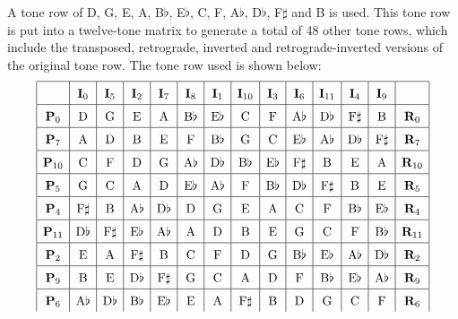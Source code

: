 \documentclass{article}
\begin{document}
A tone row of D, G, E, A, B\(\flat\), E\(\flat\), C, F, A\(\flat\), D\(\flat\), F\(\sharp\) and B is used. This tone row is put into a twelve-tone matrix to generate a total of 48 other tone rows, which include the transposed, retrograde, inverted and retrograde-inverted versions of the original tone row. The tone row used is shown below:
\\
\[\def\arraystretch{1.5}
\begin{array}{|c|c|c|c|c|c|c|c|c|c|c|c|c|c|}
\hline
&\mathbf{I}_0&\mathbf{I}_5&\mathbf{I}_2&\mathbf{I}_7&\mathbf{I}_8&\mathbf{I}_1&\mathbf{I}_{10}&\mathbf{I}_3&\mathbf{I}_6&\mathbf{I}_{11}&\mathbf{I}_4&\mathbf{I}_9&\\
\hline
\mathbf{P}_0&\mathrm{D}&\mathrm{G}&\mathrm{E}&\mathrm{A}&\mathrm{B}\flat&\mathrm{E}\flat&\mathrm{C}&\mathrm{F}&\mathrm{A}\flat&\mathrm{D}\flat&\mathrm{F}\sharp&\mathrm{B}&\mathbf{R}_0\\
\hline
\mathbf{P}_7&\mathrm{A}&\mathrm{D}&\mathrm{B}&\mathrm{E}&\mathrm{F}&\mathrm{B}\flat&\mathrm{G}&\mathrm{C}&\mathrm{E}\flat&\mathrm{A}\flat&\mathrm{D}\flat&\mathrm{F}\sharp&\mathbf{R}_7\\
\hline
\mathbf{P}_{10}&\mathrm{C}&\mathrm{F}&\mathrm{D}&\mathrm{G}&\mathrm{A}\flat&\mathrm{D}\flat&\mathrm{B}\flat&\mathrm{E}\flat&\mathrm{F}\sharp&\mathrm{B}&\mathrm{E}&\mathrm{A}&\mathbf{R}_{10}\\
\hline
\mathbf{P}_5&\mathrm{G}&\mathrm{C}&\mathrm{A}&\mathrm{D}&\mathrm{E}\flat&\mathrm{A}\flat&\mathrm{F}&\mathrm{B}\flat&\mathrm{D}\flat&\mathrm{F}\sharp&\mathrm{B}&\mathrm{E}&\mathbf{R}_5\\
\hline
\mathbf{P}_4&\mathrm{F}\sharp&\mathrm{B}&\mathrm{A}\flat&\mathrm{D}\flat&\mathrm{D}&\mathrm{G}&\mathrm{E}&\mathrm{A}&\mathrm{C}&\mathrm{F}&\mathrm{B}\flat&\mathrm{E}\flat&\mathbf{R}_4\\
\hline
\mathbf{P}_{11}&\mathrm{D}\flat&\mathrm{F}\sharp&\mathrm{E}\flat&\mathrm{A}\flat&\mathrm{A}&\mathrm{D}&\mathrm{B}&\mathrm{E}&\mathrm{G}&\mathrm{C}&\mathrm{F}&\mathrm{B}\flat&\mathbf{R}_{11}\\
\hline
\mathbf{P}_2&\mathrm{E}&\mathrm{A}&\mathrm{F}\sharp&\mathrm{B}&\mathrm{C}&\mathrm{F}&\mathrm{D}&\mathrm{G}&\mathrm{B}\flat&\mathrm{E}\flat&\mathrm{A}\flat&\mathrm{D}\flat&\mathbf{R}_2\\
\hline
\mathbf{P}_9&\mathrm{B}&\mathrm{E}&\mathrm{D}\flat&\mathrm{F}\sharp&\mathrm{G}&\mathrm{C}&\mathrm{A}&\mathrm{D}&\mathrm{F}&\mathrm{B}\flat&\mathrm{E}\flat&\mathrm{A}\flat&\mathbf{R}_9\\
\hline
\mathbf{P}_6&\mathrm{A}\flat&\mathrm{D}\flat&\mathrm{B}\flat&\mathrm{E}\flat&\mathrm{E}&\mathrm{A}&\mathrm{F}\sharp&\mathrm{B}&\mathrm{D}&\mathrm{G}&\mathrm{C}&\mathrm{F}&\mathbf{R}_6\\

\end{array}\]
\end{document}
